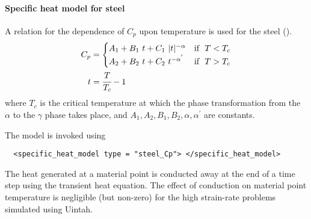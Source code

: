   \paragraph{Specific heat model for steel}
  A relation for the dependence of $C_p$ upon temperature is
  used for the steel (\cite{Lederman74}).
  \begin{align}
    C_p & = \begin{cases}
            A_1 + B_1~t + C_1~|t|^{-\alpha} & \text{if}~~ T < T_c \\
            A_2 + B_2~t + C_2~t^{-\alpha^{'}} & \text{if}~~ T > T_c 
          \end{cases} \label{eq:CpSteel}\\
    t & = \cfrac{T}{T_c} - 1 
  \end{align}
  where $T_c$ is the critical temperature at which the phase transformation
  from the $\alpha$ to the $\gamma$ phase takes place, and $A_1, A_2, B_1, B_2,
  \alpha, \alpha^{'}$ are constants.

  The model is invoked using
  \begin{verbatim}
  <specific_heat_model type = "steel_Cp"> </specific_heat_model>
  \end{verbatim}

  The heat generated at a material point is conducted away at the end of a 
  time step using the transient heat equation.  The effect of conduction on
  material point temperature is negligible (but non-zero) for the high 
  strain-rate problems simulated using Uintah.

